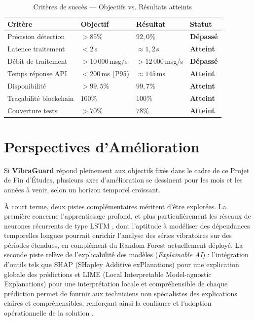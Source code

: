 \documentclass[12pt, a4paper, oneside]{report}
\newcommand{\projectname}{\textbf{VibraGuard}}
\begin{document}
\begin{table}[H]
  \centering
  \begin{tabularx}{\textwidth}{L{4.5cm} C{2.5cm} C{2.5cm} C{2cm}}
    \toprule
    \textbf{Critère} &
    \textbf{Objectif} &
    \textbf{Résultat} &
    \textbf{Statut} \\
    \midrule
           Précision détection  & $> 85\%$         & $92{,}0\%$          & \textbf{Dépassé} \\
    Latence traitement   & $< 2$\,s         & $\approx 1{,}2$\,s  & \textbf{Atteint} \\
           Débit de traitement  & $> 10\,000$\,msg/s & $> 12\,000$\,msg/s    & \textbf{Dépassé} \\
    Temps réponse API    & $< 200$\,ms (P95)& $\approx 145$\,ms   & \textbf{Atteint} \\
           Disponibilité        & $> 99{,}5\%$     & $99{,}7\%$          & \textbf{Atteint} \\
           Traçabilité blockchain & $100\%$        & $100\%$             & \textbf{Atteint} \\
    Couverture tests     & $> 70\%$         & $78\%$              & \textbf{Atteint} \\
    \bottomrule
  \end{tabularx}
  \caption{Critères de succès — Objectifs vs. Résultats atteints}
\end{table}

\section*{Perspectives d'Amélioration}

Si \projectname{} répond pleinement aux objectifs fixés dans le cadre de ce Projet de Fin
d'Études, plusieurs axes d'amélioration se dessinent pour les mois et les années à venir,
selon un horizon temporel croissant.

À court terme, deux pistes complémentaires méritent d'être explorées. La première concerne
l'apprentissage profond, et plus particulièrement les réseaux de neurones récurrents de type
LSTM \cite{hochreiter1997}, dont l'aptitude à modéliser des dépendances temporelles longues
pourrait enrichir l'analyse des séries vibratoires sur des périodes étendues, en complément du
Random Forest actuellement déployé. La seconde piste relève de l'explicabilité des modèles
(\textit{Explainable AI}) : l'intégration d'outils tels que SHAP (SHapley Additive exPlanations) pour une explication globale des prédictions et LIME (Local Interpretable Model-agnostic Explanations) pour une interprétation locale et compréhensible de chaque prédiction permet de fournir aux techniciens non spécialistes des explications claires et compréhensibles, renforçant ainsi la confiance et l'adoption opérationnelle de la solution \cite{lei2020}.
\end{document}
